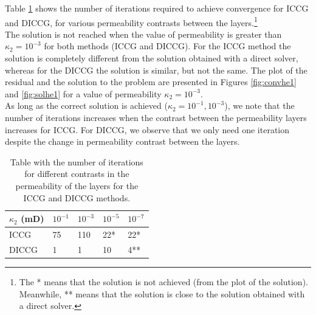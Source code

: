 \documentclass{ecmorXV}
\begin{document}
Table \ref{table:he} shows the number of iterations required to achieve convergence 
for ICCG and DICCG, for various permeability contrasts between the layers.\footnote{The * means
that the solution is not achieved (from the plot of the solution). 
Meanwhile, ** means that the solution is close to the solution obtained with a direct solver.} \\
The solution is not reached when the value of permeability is greater than $\kappa_2=10^{-3}$ for both methods (ICCG and DICCG). 
For the ICCG method the solution is completely different from the solution obtained with a direct solver, 
whereas for the DICCG the solution is similar, but not the same. The plot of the residual and the solution 
to the problem are presented in Figures \ref{fig:convhe1} and \ref{fig:solhe1} for a value of permeability $\kappa_2=10^{-3}$.\\
As long as the correct solution is achieved ($\kappa_2=10^{-1},10^{-3}$), we note that the number of 
iterations increases when the contrast between the permeability layers increases for ICCG. For DICCG, 
we observe that we only need  one iteration despite the change in permeability contrast between the layers.\\
\begin{table}[!ht]
\centering
\begin{tabular}{ |p{1.5cm}|p{1.5cm}|p{1.5cm}|p{1.5cm}| p{1.5cm}|} 
\hline
 $\kappa_2$ (mD) & $10^{-1}$& $10^{-3}$ & $10^{-5}$ & $10^{-7}$\\
 \hline
  ICCG  & 75& 110&22*&22*\\ 
  DICCG  & 1 & 1& 10&4**\\ 
 \hline
\end{tabular}
\caption{Table with the number of iterations for different contrasts in the permeability of the layers
for the ICCG and DICCG methods.}
\label{table:he}
\end{table}
\end{document}
